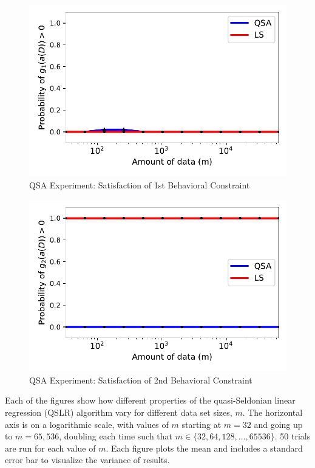 \documentclass[12pt, twoside]{amherstthesis}
\begin{document}
\begin{figure}

{\centering \includegraphics{Dasha-Asienga_StatThesis_files/figure-latex/fig6-5} 

}

\caption{QSA Experiment: Satisfaction of 1st Behavioral Constraint}\label{fig:fig6}
\end{figure}
\begin{figure}

{\centering \includegraphics{Dasha-Asienga_StatThesis_files/figure-latex/fig7-7} 

}

\caption{QSA Experiment: Satisfaction of 2nd Behavioral Constraint}\label{fig:fig7}
\end{figure}
Each of the figures show how different properties of the quasi-Seldonian linear regression (QSLR) algorithm vary for different data set sizes, \(\textit{m}\). The horizontal axis is on a logarithmic scale, with values of \(\textit{m}\) starting at \(\textit{m} = 32\) and going up to \(\textit{m} = 65,536\), doubling each time such that \(\textit{m} \in \{32, 64, 128, \ldots, 65536 \}\). 50 trials are run for each value of \(m\). Each figure plots the mean and includes a standard error bar to visualize the variance of results.
\end{document}
